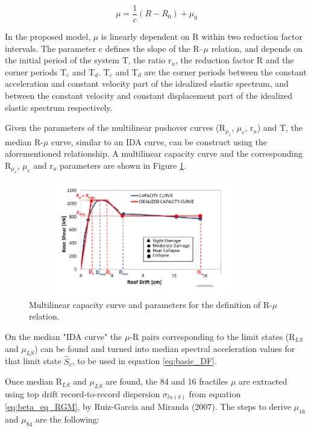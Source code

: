 \begin{equation}
\label{eq:mu_DF}
\mu = \frac{1}{c} (R-R_{0})+\mu_{0}
\end{equation}

In the proposed model, $\mu$ is linearly dependent on R within two reduction factor intervals. The parameter c defines the slope of the R–$\mu$ relation, and depends on the initial period of the system T, the ratio r$_{u}$, the reduction factor R and the corner periods T$_{c}$ and T$_{d}$. T$_{c}$ and T$_{d}$ are the corner periods between the constant acceleration and constant velocity part of the idealized elastic spectrum, and between the constant velocity and constant displacement part of the idealized elastic spectrum respectively.

Given the parameters of the multilinear pushover curves (R$_{\mu_{c}}$, $\mu_{c}$, r$_{u}$) and T, the median R-$\mu$ curve, similar to an IDA curve, can be construct using the aforementioned relationship.  A multilinear capacity curve and the corresponding R$_{\mu_{c}}$, $\mu_{c}$ and r$_{u}$ parameters are shown in Figure \ref{fig:quadrilinear_DF}.

\begin{figure}[H]
\centering
\includegraphics[width=10cm,height=5cm]{./figures/quadrilinearDF.jpg}
\caption{Multilinear capacity curve and parameters for the definition of R-$\mu$ relation.}
\label{fig:quadrilinear_DF}
\end{figure}

On the median "IDA curve" the $\mu$-R pairs corresponding to the limit states (R$_{LS}$ and $\mu_{LS}$) can be found and turned into median spectral acceleration values for that limit state $\hat{S}_c$, to be used in equation \ref{eq:basic_DF}.

Once median R$_{LS}$ and $\mu_{LS}$ are found, the 84 and 16 fractiles $\mu$ are extracted using top drift record-to-record dispersion $\sigma_{ln(\delta)}$ from equation \ref{eq:beta_eq_RGM}, by Ruiz-Garcia and Miranda (2007). The steps to derive $\mu_{16}$ and $\mu_{84}$ are the following:
 
